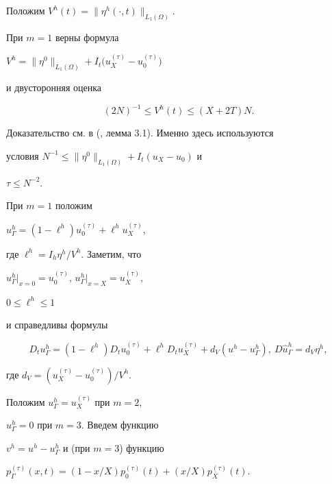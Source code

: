 \documentclass[12pt]{article}
\theoremstyle{plain} %
\newtheorem{lemm}{\hskip\parindent Лемма}[section]
\theoremstyle{definition}
\numberwithin{equation}{section}
\begin{document}
Положим $V^h(t)=\|\eta^h(\cdot,t)\|_{L_1(\Omega)}$.





\begin{lemm} При $m=1$ верны формула


$V^h=\|\eta^{0}\|_{L_1(\Omega)}+


I_t\bigl(u_X^{(\tau)}-u_0^{(\tau)}\bigr)$


и двусторонняя оценка


\begin{equation}


(2N)^{-1}\le V^h(t)\le (X+2T)N.


\end{equation}


\end{lemm}





Доказательство см. в (\cite{Amo7}, лемма 3.1). Именно здесь используются


условия $N^{-1}\le \|\eta^0\|_{L_1(\Omega)}+I_t(u_X-u_0)$ и


$\tau\le N^{-2}$.





При $m=1$ положим


$u^h_\Gamma=(1-\ell^h)u^{(\tau)}_0+\ell^h u^{(\tau)}_X$,


где $\ell^h=I_h\eta^h/V^h$. Заметим, что


$u^h_\Gamma|_{x=0}=u^{(\tau)}_0$, $u^h_\Gamma|_{x=X}=u^{(\tau)}_X$,


$0\le \ell^h\le 1$


и справедливы формулы


\begin{equation}


D_tu^h_\Gamma=(1-\ell^h)D_tu^{(\tau)}_0+\ell^h D_tu^{(\tau)}_X


+d_V(u^h-u^h_\Gamma),\


D\widehat u^h_\Gamma= d_V\eta^h,


\end{equation}


где $d_V= (u^{(\tau)}_X - u^{(\tau)}_0)/{V^h}$.


Положим $u^h_\Gamma = u^{(\tau)}_X$ при $m=2$,


$u^h_\Gamma =0$ при $m=3$. Введем функцию


$v^h = u^h - u^h_\Gamma$ и (при $m=3$) функцию


$p^{(\tau)}_\Gamma(x,t)=\left(1-x/X\right)p^{(\tau)}_0(t) +(x/X)p^{(\tau)}_X(t)$.
\end{document}
